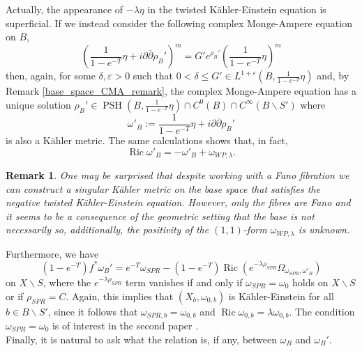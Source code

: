 \documentclass[12pt]{article}
\newtheorem{remark}[theorem]{Remark}
\numberwithin{equation}{section}
\renewcommand{\d}{\partial}
\newcommand{\dbar}{\overline{\partial}}
\newcommand{\e}{\varepsilon}
\DeclareMathOperator{\Ric}{Ric}
\DeclareMathOperator{\PSH}{PSH}
\begin{document}
\noindent Actually, the appearance of $-\lambda \eta$ in the twisted K\"ahler-Einstein equation is superficial. If we instead consider the following complex Monge-Ampere equation on $B$,
\begin{equation*}
    \left(\frac{1}{1-e^{-T}}\eta + i\d\dbar \rho_B'\right)^m =  G' e^{\rho_B'} \left(\frac{1}{1-e^{-T}}\eta\right)^m
\end{equation*}
then, again, for some $\delta, \varepsilon > 0 $ such that $0 < \delta \leq G' \in L^{1+\e}(B,\frac{1}{1-e^{-T}}\eta)$ and, by Remark \ref{base_space_CMA_remark}, the complex Monge-Ampere equation has a unique solution $\rho_B' \in \PSH(B,\frac{1}{1-e^{-T}}\eta) \cap C^0(B) \cap C^{\infty}(B\backslash S')$ where
\begin{equation*}
    \omega'_B := \frac{1}{1-e^{-T}}\eta + i\d\dbar \rho_B'
\end{equation*}
is also a K\"ahler metric. The same calculations shows that, in fact,
\begin{equation*}
    \Ric \omega'_B = -\omega'_B + \omega_{WP,\lambda}.
\end{equation*}

\begin{remark}
One may be surprised that despite working with a Fano fibration we can construct a singular K\"ahler metric on the base space that satisfies the negative twisted K\"ahler-Einstein equation. However, only the fibres are Fano and it seems to be a consequence of the geometric setting that the base is not necessarily so, additionally, the positivity of the $(1,1)$-form $\omega_{WP,\lambda}$ is unknown. 
\end{remark}

\noindent Furthermore, we have
\begin{equation}\label{base_metric_2_volume_form_ric_curvature}
    (1-e^{-T})f^*\omega_B' = e^{-T} \omega_{SPR} - (1-e^{-T}) \Ric\left(e^{-\lambda \rho_{SPR}} \Omega_{\omega_{SPR},\omega'_B}\right)
\end{equation}
on $X \backslash S$, where the $e^{-\lambda \rho_{SPR}}$ term vanishes if and only if $\omega_{SPR} = \omega_0$ holds on $X \backslash S$ or if $\rho_{SPR} = C$. Again, this implies that $(X_b,\omega_{0,b})$ is K\"ahler-Einstein for all $b \in B \backslash S'$, since it follows that $\omega_{SPR,b} = \omega_{0,b}$ and $\Ric \omega_{0,b} = \lambda \omega_{0,b}$. The condition $\omega_{SPR} = \omega_0$ is of interest in the second paper \cite{B25}.\\
Finally, it is natural to ask what the relation is, if any, between $\omega_B$ and $\omega_B'$.
\end{document}

